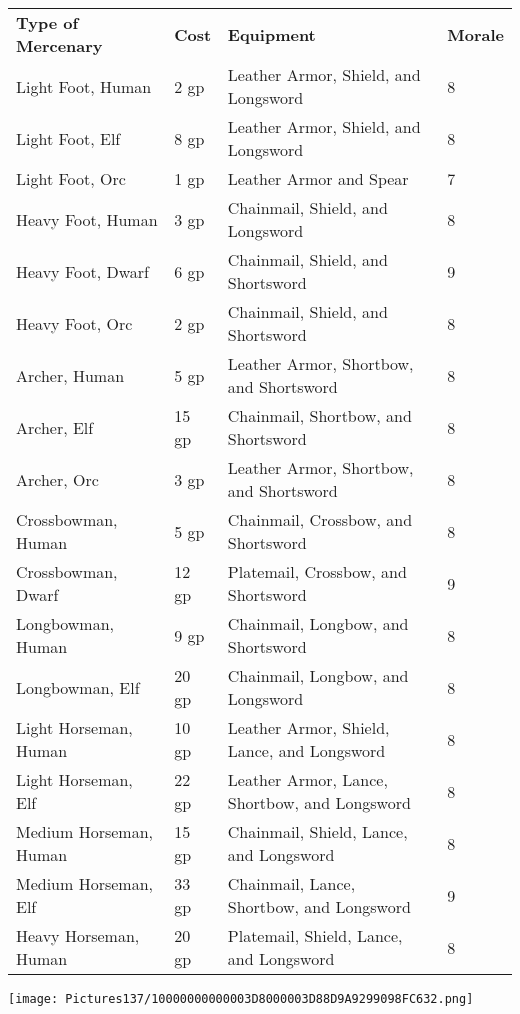 \documentclass[a4paper,twoside,openany,10pt]{book}
\begin{document}
\begin{tabular*}{0.93\linewidth}{@{\extracolsep{\fill}}llll}
\textbf{Type of Mercenary}&\textbf{Cost}&\textbf{Equipment}&\textbf{Morale}\\
Light Foot, Human&2 gp&Leather Armor, Shield, and Longsword&8\\\toprule
Light Foot, Elf&8 gp&Leather Armor, Shield, and Longsword&8\\\hline
Light Foot, Orc&1 gp&Leather Armor and Spear&7\\\hline
Heavy Foot, Human&3 gp&Chainmail, Shield, and Longsword&8\\\hline
Heavy Foot, Dwarf&6 gp&Chainmail, Shield, and Shortsword&9\\\hline
Heavy Foot, Orc&2 gp&Chainmail, Shield, and Shortsword&8\\\hline
Archer, Human&5 gp&Leather Armor, Shortbow, and Shortsword&8\\\hline
Archer, Elf&15 gp&Chainmail, Shortbow, and Shortsword&8\\\hline
Archer, Orc&3 gp&Leather Armor, Shortbow, and Shortsword&8\\\hline
Crossbowman, Human&5 gp&Chainmail, Crossbow, and Shortsword&8\\\hline
Crossbowman, Dwarf&12 gp&Platemail, Crossbow, and Shortsword&9\\\hline
Longbowman, Human&9 gp&Chainmail, Longbow, and Shortsword&8\\\hline
Longbowman, Elf&20 gp&Chainmail, Longbow, and Longsword&8\\\hline
Light Horseman, Human&10 gp&Leather Armor, Shield, Lance, and Longsword&8\\\hline
Light Horseman, Elf&22 gp&Leather Armor, Lance, Shortbow, and Longsword&8\\\hline
Medium Horseman, Human&15 gp&Chainmail, Shield, Lance, and Longsword&8\\\hline
Medium Horseman, Elf&33 gp&Chainmail, Lance, Shortbow, and Longsword&9\\\hline
Heavy Horseman, Human&20 gp&Platemail, Shield, Lance, and Longsword&8\\\hline
\end{tabular*}

\vfill

\begin{center}
	\texttt{[image: Pictures137/10000000000003D8000003D88D9A9299098FC632.png]}
\end{center}

\pagebreak
\end{document}
